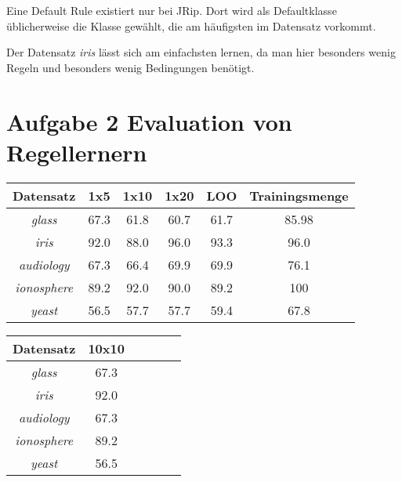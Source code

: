 Eine Default Rule existiert nur bei JRip. Dort wird als Defaultklasse \"ublicherweise die Klasse gew\"ahlt, die am h\"aufigsten im Datensatz vorkommt. 

Der Datensatz \emph{iris} l\"asst sich am einfachsten lernen, da man hier besonders wenig Regeln und besonders wenig Bedingungen ben\"otigt.



\section{Aufgabe 2 Evaluation von Regellernern} %
\label{sec:aufgabe_2_evaluation_von_regellernern}

\begin{tabular}{c|c|c|c|c|c}
				Datensatz         & 1x5  & 1x10 & 1x20 & LOO  & Trainingsmenge   \\ \hline
				\emph{glass}      & 67.3 & 61.8 & 60.7 & 61.7 & 85.98   \\ \hline
				\emph{iris}       & 92.0 & 88.0 & 96.0 & 93.3 & 96.0    \\ \hline
				\emph{audiology}  & 67.3 & 66.4 & 69.9 & 69.9 & 76.1    \\ \hline
				\emph{ionosphere} & 89.2 & 92.0 & 90.0 & 89.2 & 100   \\ \hline
				\emph{yeast}      & 56.5 & 57.7 & 57.7 & 59.4 & 67.8   \\ \hline
\end{tabular}

\begin{tabular}{c|c|c|c|c|c}
				Datensatz         & 10x10    \\ \hline
				\emph{glass}      & 67.3     \\ \hline
				\emph{iris}       & 92.0     \\ \hline
				\emph{audiology}  & 67.3     \\ \hline
				\emph{ionosphere} & 89.2     \\ \hline
				\emph{yeast}      & 56.5     \\ \hline
\end{tabular}




